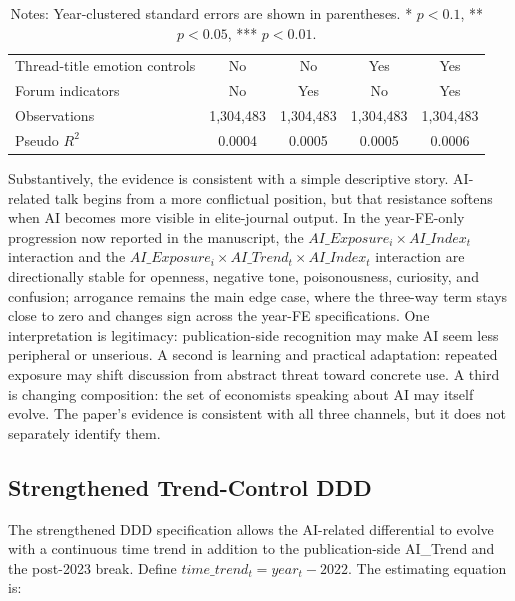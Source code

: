 \documentclass[11pt]{article}
\begin{document}
\begin{table}[!htbp]
{\begin{tabular}{lcccc}
        \midrule
        Thread-title emotion controls & No & No & Yes & Yes \\
        Forum indicators & No & Yes & No & Yes \\
        Observations & 1,304,483 & 1,304,483 & 1,304,483 & 1,304,483 \\
        Pseudo $R^2$ & 0.0004 & 0.0005 & 0.0005 & 0.0006 \\
        \bottomrule
    \end{tabular}}
    {\captionsetup{justification=raggedright,singlelinecheck=false}
    \caption*{\footnotesize Notes: Year-clustered standard errors are shown in parentheses. * \(p<0.1\), ** \(p<0.05\), *** \(p<0.01\).}}
\end{table}

\FloatBarrier

Substantively, the evidence is consistent with a simple descriptive story. AI-related talk begins from a more conflictual position, but that resistance softens when AI becomes more visible in elite-journal output. In the year-FE-only progression now reported in the manuscript, the $AI\_Exposure_i \times AI\_Index_t$ interaction and the $AI\_Exposure_i \times AI\_Trend_t \times AI\_Index_t$ interaction are directionally stable for openness, negative tone, poisonousness, curiosity, and confusion; arrogance remains the main edge case, where the three-way term stays close to zero and changes sign across the year-FE specifications. One interpretation is legitimacy: publication-side recognition may make AI seem less peripheral or unserious. A second is learning and practical adaptation: repeated exposure may shift discussion from abstract threat toward concrete use. A third is changing composition: the set of economists speaking about AI may itself evolve. The paper's evidence is consistent with all three channels, but it does not separately identify them.

\subsection{Strengthened Trend-Control DDD}

The strengthened DDD specification allows the AI-related differential to evolve with a continuous time trend in addition to the publication-side AI\_Trend and the post-2023 break. Define $time\_trend_t = year_t - 2022$. The estimating equation is:
\end{document}
